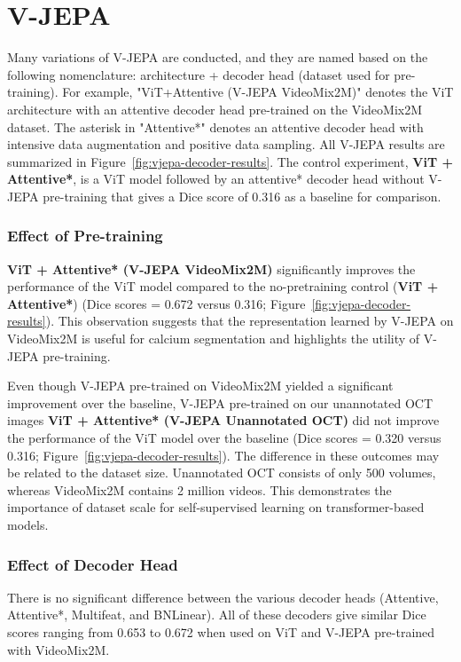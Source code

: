 \documentclass[a4paper,11pt,oneside]{report}
\begin{document}
\section{V-JEPA}
Many variations of V-JEPA are conducted, and they are named based on the following nomenclature: architecture + decoder head (dataset used for pre-training). For example, "ViT+Attentive (V-JEPA VideoMix2M)" denotes the ViT architecture with an attentive decoder head pre-trained on the VideoMix2M dataset. The asterisk in "Attentive*" denotes an attentive decoder head with intensive data augmentation and positive data sampling. All V-JEPA results are summarized in Figure~\ref{fig:vjepa-decoder-results}. The control experiment, \textbf{ViT + Attentive*}, is a ViT model followed by an attentive* decoder head without V-JEPA pre-training that gives a Dice score of 0.316 as a baseline for comparison. 

\subsubsection{Effect of Pre-training}
\textbf{ViT + Attentive* (V-JEPA VideoMix2M)} significantly improves the performance of the ViT model compared to the no-pretraining control (\textbf{ViT + Attentive*}) (Dice scores = 0.672 versus 0.316; Figure~\ref{fig:vjepa-decoder-results}). This observation suggests that the representation learned by V-JEPA on VideoMix2M is useful for calcium segmentation and highlights the utility of V-JEPA pre-training. 

Even though V-JEPA pre-trained on VideoMix2M yielded a significant improvement over the baseline, V-JEPA pre-trained on our unannotated OCT images \textbf{ViT + Attentive* (V-JEPA Unannotated OCT)} did not improve the performance of the ViT model over the baseline (Dice scores = 0.320 versus 0.316; Figure~\ref{fig:vjepa-decoder-results}). The difference in these outcomes may be related to the dataset size. Unannotated OCT consists of only 500 volumes, whereas VideoMix2M contains 2 million videos. This demonstrates the importance of dataset scale for self-supervised learning on transformer-based models.

\subsubsection{Effect of Decoder Head}
There is no significant difference between the various decoder heads (Attentive, Attentive*, Multifeat, and BNLinear). All of these decoders give similar Dice scores ranging from 0.653 to 0.672 when used on ViT and V-JEPA pre-trained with VideoMix2M.
\end{document}
